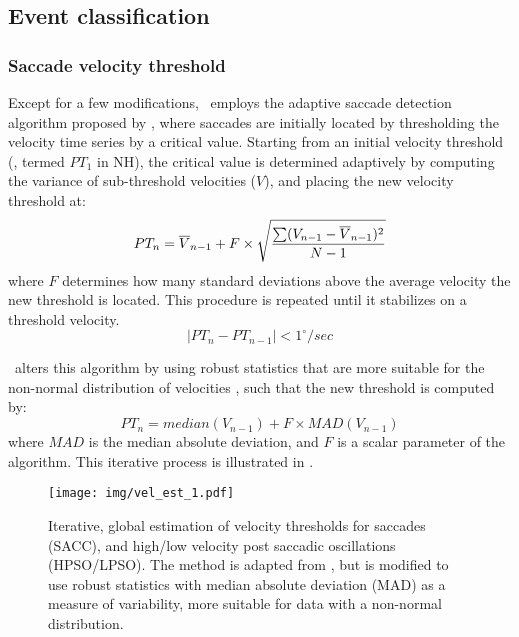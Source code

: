 \subsection*{Event classification}

\subsubsection*{Saccade velocity threshold}

Except for a few modifications, \remodnav\ employs the adaptive saccade
detection algorithm proposed by \cite{Nystrom2010AnData}, where saccades are
initially located by thresholding the velocity time series by a critical value.
Starting from an initial velocity threshold (,
termed $PT_1$ in NH), the critical value is determined adaptively by computing
the variance of sub-threshold velocities ($V$), and placing the new velocity
threshold at:
%
\begin{equation} PT_n = \overline{V}_{n-1} + F \times \sqrt{{\sum(V_{n-1} -
  \overline{V}_{n-1})^2} \over {N-1}} \end{equation}
%
where $F$ determines how many standard deviations above the average velocity
the new threshold is located.  This procedure is repeated until it stabilizes
on a threshold velocity.
%
\begin{equation} |PT_n - PT_{n-1}| < 1^\circ/sec \end{equation}

\remodnav\ alters this algorithm by using robust statistics that are more
suitable for the non-normal distribution of velocities \citep{Friedman2018},
such that the new threshold is computed by:
%
\begin{equation}\label{eq:threshold}
PT_n = median({V}_{n-1}) + F \times MAD({V}_{n-1})
\end{equation}
%
where $MAD$ is the median absolute deviation, and $F$ is a
scalar parameter of the algorithm.
This iterative process is illustrated in .

\begin{figure}
  \texttt{[image: img/vel\_est\_1.pdf]}
  \caption{Iterative, global estimation of velocity thresholds
    for saccades (SACC), and high/low velocity post saccadic oscillations (HPSO/LPSO).
    The method is adapted from \cite{Nystrom2010AnData}, but is modified to use robust statistics
    with median absolute deviation (MAD) as a measure of variability, more suitable
    for data with a non-normal distribution.}
    \label{fig:velest1}
\end{figure}

